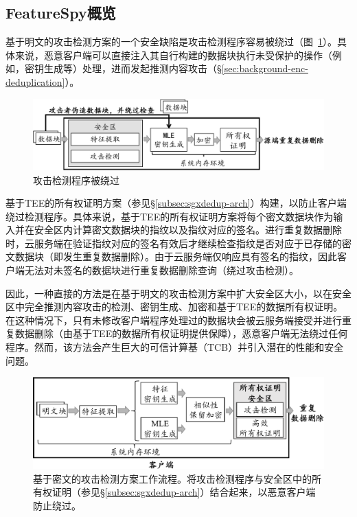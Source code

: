\subsection{FeatureSpy概览}
\label{subsec:featurespy-secure_design}

基于明文的攻击检测方案的一个安全缺陷是攻击检测程序容易被绕过（图~\ref{fig:featurespy-architecture-strawman-bypass}）。具体来说，恶意客户端可以直接注入其自行构建的数据块执行未受保护的操作（例如，密钥生成等）处理，进而发起推测内容攻击（\S\ref{sec:background-enc-deduplication}）。

\begin{figure}[!htb]
  \centering
  \includegraphics[width=\textwidth]{pic/featurespy/naive-problem.pdf}
  \caption{攻击检测程序被绕过}
  \label{fig:featurespy-architecture-strawman-bypass}
\end{figure}


\sysnameF 基于TEE的所有权证明方案（参见\S\ref{subsec:sgxdedup-arch}）构建，以防止客户端绕过检测程序。具体来说，基于TEE的所有权证明方案将每个密文数据块作为输入并在安全区内计算密文数据块的指纹以及指纹对应的签名。进行重复数据删除时，云服务端在验证指纹对应的签名有效后才继续检查指纹是否对应于已存储的密文数据块（即发生重复数据删除）。由于云服务端仅响应具有签名的指纹，因此客户端无法对未签名的数据块进行重复数据删除查询（绕过攻击检测）。

因此，一种直接的方法是在基于明文的攻击检测方案中扩大安全区大小，以在安全区中完全推测内容攻击的检测、密钥生成、加密和基于TEE的数据所有权证明。在这种情况下，只有未修改客户端程序处理过的数据块会被云服务端接受并进行重复数据删除（由基于TEE的数据所有权证明提供保障），恶意客户端无法绕过任何程序。然而，该方法会产生巨大的可信计算基（TCB）并引入潜在的性能\cite{arnautov2016SCONE, harnik2018SGX, dinhngoc2019Everything}和安全\cite{lie2005TCB}问题。

\begin{figure}[!htb]
  \centering
  \includegraphics[width=\textwidth]{pic/featurespy/architecture.pdf}
  \caption{基于密文的攻击检测方案工作流程。\sysnameF 将攻击检测程序与安全区中的所有权证明（参见\S\ref{subsec:sgxdedup-arch}）结合起来，以恶意客户端防止绕过。}
  \label{fig:featurespy-architecture-secure}
\end{figure}

